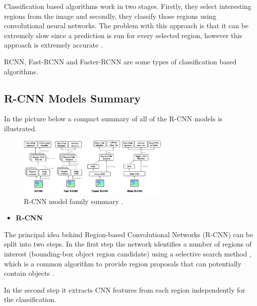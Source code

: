 \par Classification based algorithms work in two stages. Firstly, they select interesting regions from the image and secondly, they classify those regions using convolutional neural networks. The problem with this approach is that it can be extremely slow since a prediction is run for every selected region, however this approach is extremely accurate \cite{Lin2017}. 
\par RCNN, Fast-RCNN and Faster-RCNN are some types of classification based algorithms.  

    \subsection{R-CNN Models Summary}

    \par In the picture below a  compact summary of all of the R-CNN models is illustrated.

    \begin{figure}[H]
        \centering
        \captionsetup{justification=centering}
        \includegraphics[width=0.65\textwidth]{Sections/2StateOfTheArt/2_images/rcnn-family-summary.png}
        \caption[R-CNN model family summary]{R-CNN model family summary \cite{weng2017detection3}.} 
    \end{figure}

\begin{itemize}
  
    \item\textbf{R-CNN}
\end{itemize}

    
    \par The principal idea behind Region-based Convolutional Networks (R-CNN) can be split into two steps. In the first step the network identifies a number of regions of interest (bounding-box object region candidate) using a selective search method \cite{weng2017detection3}, which is a common algorithm to provide region proposals that can potentially contain objects \cite{weng2017detection1}.
    \par In the second step it extracts CNN features from each region independently for the classification.

